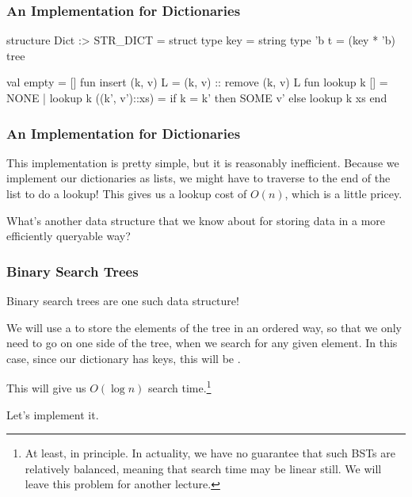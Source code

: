 \documentclass[aspectratio=169, handout]{beamer}
\begin{document}
\begin{frame}[fragile]
  \frametitle{An Implementation for Dictionaries}

  \begin{codeblock}
    structure Dict :> STR_DICT =
      struct
        type key = string
        type 'b t = (key * 'b) tree

        val empty = []
        fun insert (k, v) L = (k, v) :: remove (k, v) L
        fun lookup k [] = NONE
          | lookup k ((k', v')::xs) =
              if k = k' then SOME v'
              else lookup k xs
      end
  \end{codeblock}
\end{frame}

\begin{frame}[fragile]
  \frametitle{An Implementation for Dictionaries}

  This implementation is pretty simple, but it is reasonably
  inefficient. Because we implement our dictionaries as lists,
  we might have to traverse to the end of the list to do a
  lookup! This gives us a lookup cost of $O(n)$, which is a
  little pricey.

  \pause
  \vspace{\fill}

  What's another data structure that we know about for storing
  data in a more efficiently queryable way?
\end{frame}

\begin{frame}[fragile]
  \frametitle{Binary Search Trees}

  Binary search trees are one such data structure!

  \pause
  \vspace{\fill}

  We will use a  to store the elements
  of the tree in an ordered way, so that we only need to go on
  one side of the tree, when we search for any given element. In
  this case, since our dictionary has  keys, this
  will be .

  \pause
  \vspace{\fill}

  This will give us $O(\log n)$ search time.\footnote{
    At least, in principle. In actuality, we have no guarantee
    that such BSTs are relatively balanced, meaning that search time may be
    linear still. We will leave this problem for another lecture.
  }

  \pause
  \vspace{\fill}

  Let's implement it.
\end{frame}
\end{document}
